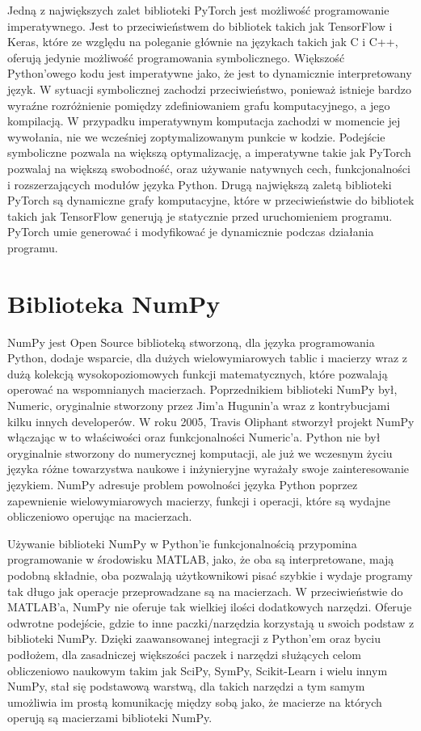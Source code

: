 Jedną z największych zalet biblioteki PyTorch jest możliwość programowanie imperatywnego. Jest to przeciwieństwem do bibliotek takich jak TensorFlow i Keras, które ze względu na poleganie głównie na językach takich jak C i C++, oferują jedynie możliwość programowania symbolicznego. Większość Python'owego kodu jest imperatywne jako, że jest to dynamicznie interpretowany język. W sytuacji symbolicznej zachodzi przeciwieństwo, ponieważ istnieje bardzo wyraźne rozróżnienie pomiędzy zdefiniowaniem grafu komputacyjnego, a jego kompilacją. W przypadku imperatywnym komputacja zachodzi w momencie jej wywołania, nie we wcześniej zoptymalizowanym punkcie w kodzie. Podejście symboliczne pozwala na większą optymalizację, a imperatywne takie jak PyTorch pozwalaj na większą swobodność, oraz używanie natywnych cech, funkcjonalności i rozszerzających modułów języka Python.
Drugą największą zaletą biblioteki PyTorch są dynamiczne grafy komputacyjne, które w przeciwieństwie do bibliotek takich jak TensorFlow generują je statycznie przed uruchomieniem programu. PyTorch umie generować i modyfikować je dynamicznie podczas działania programu.

\clearpage

\section{Biblioteka NumPy}
\label{section:numpy}
NumPy \cite{PythonForDataAnalysis} \cite{SciPyAndNumPy} \cite{NumPyManual} \cite{WikipediaNumPy} jest Open Source biblioteką stworzoną, dla języka programowania Python, dodaje wsparcie, dla dużych wielowymiarowych tablic i macierzy wraz z dużą kolekcją wysokopoziomowych funkcji matematycznych, które pozwalają operować na wspomnianych macierzach. Poprzednikiem biblioteki NumPy był, Numeric, oryginalnie stworzony przez Jim'a Hugunin'a wraz z kontrybucjami kilku innych developerów. W roku 2005, Travis Oliphant stworzył projekt NumPy włączając w to właściwości oraz funkcjonalności Numeric'a.
Python nie był oryginalnie stworzony do numerycznej komputacji, ale już we wczesnym życiu języka różne towarzystwa naukowe i inżynieryjne wyrażały swoje zainteresowanie językiem.
NumPy adresuje problem powolności języka Python poprzez zapewnienie wielowymiarowych macierzy, funkcji i operacji, które są wydajne obliczeniowo operując na macierzach.

Używanie biblioteki NumPy w Python'ie funkcjonalnością przypomina programowanie w środowisku MATLAB, jako, że oba są interpretowane, mają podobną składnie, oba pozwalają użytkownikowi pisać szybkie i wydaje programy tak długo jak operacje przeprowadzane są na macierzach. W przeciwieństwie do MATLAB'a, NumPy nie oferuje tak wielkiej ilości dodatkowych narzędzi. Oferuje odwrotne podejście, gdzie to inne paczki/narzędzia korzystają u swoich podstaw z biblioteki NumPy. Dzięki zaawansowanej integracji z Python'em oraz byciu podłożem, dla zasadniczej większości paczek i narzędzi służących celom obliczeniowo naukowym takim jak SciPy, SymPy, Scikit-Learn i wielu innym NumPy, stał się podstawową warstwą, dla takich narzędzi a tym samym umożliwia im prostą komunikację między sobą jako, że macierze na których operują są macierzami biblioteki NumPy.

